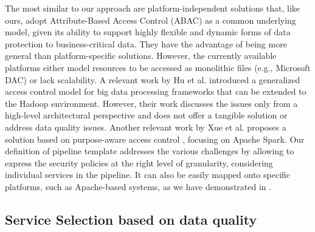 The most similar to our approach are platform-independent solutions that, like ours, adopt Attribute-Based Access Control (ABAC) \cite{XACML3.0} as a common underlying model, given its ability to support highly flexible and dynamic forms of data protection to business-critical data. They have the advantage of being more general than platform-specific solutions. However, the currently available platforms either model resources to be accessed as monolithic files (e.g., Microsoft DAC) or lack scalability. A relevant work by Hu et al.  \cite{ HUFerraiolo:2014} introduced a generalized access control model for big data processing frameworks that can be extended to the Hadoop environment. However, their work discusses the issues only from a high-level architectural perspective and does not offer a tangible solution or address data quality issues. Another relevant work by Xue et al.  \cite{GuardSpark:ACSAC:2020} proposes a solution based on purpose-aware access control \cite{Byun2008}, focusing on Apache Spark.
%
Our definition of pipeline template addresses the various challenges by allowing to express the security policies at the right level of granularity, considering individual services in the pipeline. It can also be easily mapped onto specific platforms, such as Apache-based systems, as we have demonstrated in \cite{medes2021}.

\subsection{Service Selection based on data quality}\label{sec:servicesel}


